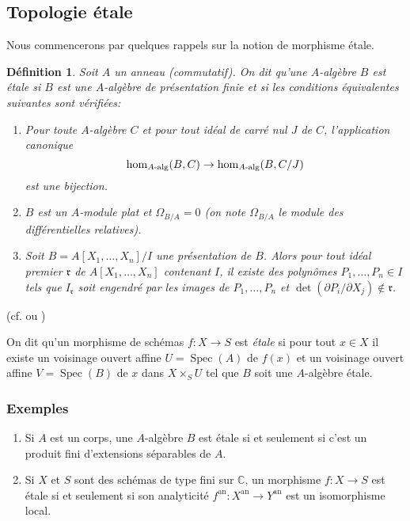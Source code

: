 \documentclass{article}
\DeclareMathOperator{\spec}{Spec}
\newcommand{\dC}{\mathbb{C}}
\newcommand{\fr}{\mathfrak{r}}
\newtheorem{definition}[subsubsection]{Définition}
\begin{document}
\subsection{Topologie étale}\label{2-1}

Nous commencerons par quelques rappels sur la notion de morphisme étale. 

\begin{definition}\label{2-1-1}
Soit $A$ un anneau (commutatif). On dit qu'une $A$-algèbre $B$ est étale si 
$B$ est une $A$-algèbre de présentation finie et si les conditions 
équivalentes suivantes sont vérifiées:
\begin{enumerate}[\indent a)]
  \item Pour toute $A$-algèbre $C$ et pour tout idéal de carré nul $J$ de 
    $C$, l'application canonique 
    \[
      \hom_{A\textnormal{-alg}}(B,C) \to \hom_{A\textnormal{-alg}}(B,C/J)
    \]
    est une bijection.
  \item $B$ est un $A$-module plat et $\Omega_{B/A}=0$ (on note $\Omega_{B/A}$ 
    le module des différentielles relatives).
  \item Soit $B=A[X_1,\dotsc,X_n]/I$ une présentation de $B$. Alors pour tout 
    idéal premier $\fr$ de $A[X_1,\dotsc,X_n]$ contenant $I$, il existe des 
    polynômes $P_1,\dotsc,P_n\in I$ tels que $I_\fr$ soit engendré par les 
    images de $P_1,\dotsc,P_n$ et $\det(\partial P_i/\partial X_j)\notin \fr$.  
\end{enumerate}
\end{definition}
(cf. \cite[I]{7} ou \cite[V]{11})

On dit qu'un morphisme de schémas $f:X\to S$ est \emph{étale} si pour tout 
$x\in X$ il existe un voisinage ouvert affine $U=\spec(A)$ de $f(x)$ et un 
voisinage ouvert affine $V=\spec(B)$ de $x$ dans $X\times_S U$ tel que $B$ soit 
une $A$-algèbre étale. 





\subsubsection{Exemples}\label{2-1-2}
\begin{enumerate}[\indent a)]
  \item Si $A$ est un corps, une $A$-algèbre $B$ est étale si et seulement 
    si c'est un produit fini d'extensions séparables de $A$. 
  \item Si $X$ et $S$ sont des schémas de type fini sur $\dC$, un morphisme 
    $f:X\to S$ est étale si et seulement si son analyticité 
    $f^{\text{an}}:X^{\text{an}}\to Y^{\text{an}}$ est un isomorphisme local.
\end{enumerate}
\end{document}
